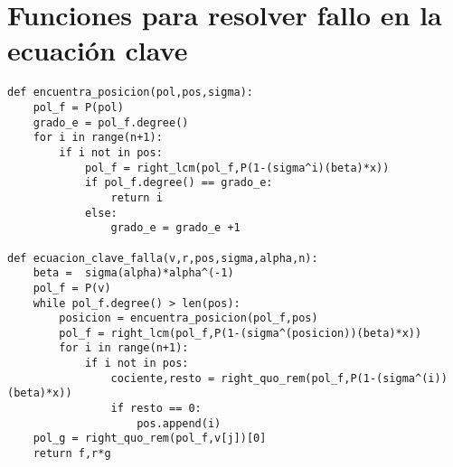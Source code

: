 \section{Funciones para resolver fallo en la ecuación clave}

\begin{verbatim}
def encuentra_posicion(pol,pos,sigma):
    pol_f = P(pol)
    grado_e = pol_f.degree()
    for i in range(n+1):
        if i not in pos:
            pol_f = right_lcm(pol_f,P(1-(sigma^i)(beta)*x))
            if pol_f.degree() == grado_e:
                return i
            else:
                grado_e = grado_e +1
                
def ecuacion_clave_falla(v,r,pos,sigma,alpha,n):
    beta =  sigma(alpha)*alpha^(-1)
    pol_f = P(v)
    while pol_f.degree() > len(pos):
        posicion = encuentra_posicion(pol_f,pos)
        pol_f = right_lcm(pol_f,P(1-(sigma^(posicion))(beta)*x))
        for i in range(n+1):
            if i not in pos:
                cociente,resto = right_quo_rem(pol_f,P(1-(sigma^(i))(beta)*x))
                if resto == 0:
                    pos.append(i)
    pol_g = right_quo_rem(pol_f,v[j])[0]
    return f,r*g

\end{verbatim}
